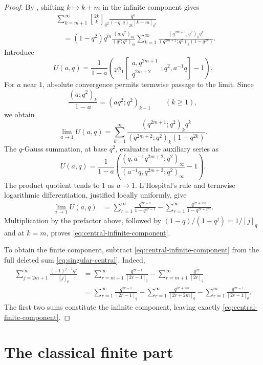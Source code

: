 \documentclass[11pt,oneside,openany]{book}
\theoremstyle{definition}
\theoremstyle{remark}
\newcommand{\Qbinom}[3]{\genfrac{[}{]}{0pt}{}{#1}{#2}_{#3}}
\begin{document}
\begin{proof}
By , shifting $k\mapsto k+m$ in the
infinite component gives
\begin{align*}
 &\sum_{k=m+1}^{\infty}
 \Qbinom{2k}{k}{q^2}
 \frac{q^k}{(-q;q)_{2k}[k-m]_{q^2}}\\
 &\quad=(1-q^2)q^m\frac{(q;q^2)_m}{(q^2;q^2)_m}
 \sum_{k=1}^{\infty}
 \frac{(q^{2m+1};q^2)_kq^k}
 {(q^{2m+2};q^2)_k(1-q^{2k})}.
\end{align*}
Introduce
\[
 U(a,q)=\frac{1}{1-a}\left(
 {}_2\phi_1\!\left[
 \begin{matrix}a,q^{2m+1}\\q^{2m+2}\end{matrix};q^2,a^{-1}q
 \right]-1\right).
\]
For $a$ near $1$, absolute convergence permits termwise passage to the
limit.  Since
\[
 \frac{(a;q^2)_k}{1-a}=(aq^2;q^2)_{k-1}\qquad(k\ge1),
\]
we obtain
\[
 \lim_{a\to1}U(a,q)=
 \sum_{k=1}^{\infty}
 \frac{(q^{2m+1};q^2)_kq^k}
 {(q^{2m+2};q^2)_k(1-q^{2k})}.
\]
The $q$-Gauss summation, at base $q^2$, evaluates the auxiliary series as
\[
 U(a,q)=\frac{1}{1-a}\left(
 \frac{(q,a^{-1}q^{2m+2};q^2)_\infty}
 {(a^{-1}q,q^{2m+2};q^2)_\infty}-1\right).
\]
The product quotient tends to $1$ as $a\to1$.  L'Hospital's rule and
termwise logarithmic differentiation, justified locally uniformly, give
\begin{align*}
 \lim_{a\to1}U(a,q)
 &=\sum_{r=1}^{\infty}\frac{q^{2r-1}}{1-q^{2r-1}}
   -\sum_{r=1}^{\infty}\frac{q^{2r+2m}}{1-q^{2r+2m}}.
\end{align*}
Multiplication by the prefactor above, followed by
$(1-q)/(1-q^j)=1/[j]_q$ and  at $k=m$,
proves \eqref{eq:central-infinite-component}.

To obtain the finite component, subtract
\eqref{eq:central-infinite-component} from the full deleted sum
\eqref{eq:singular-central}.  Indeed,
\begin{align*}
 \sum_{j=2m+1}^{\infty}\frac{(-1)^{j-1}q^j}{[j]_q}
 &=\sum_{r=m+1}^{\infty}\frac{q^{2r-1}}{[2r-1]_q}
   -\sum_{r=m+1}^{\infty}\frac{q^{2r}}{[2r]_q}\\
 &=\sum_{r=1}^{\infty}\frac{q^{2r-1}}{[2r-1]_q}
   -\sum_{r=1}^{\infty}\frac{q^{2r+2m}}{[2r+2m]_q}
   -\sum_{r=1}^{m}\frac{q^{2r-1}}{[2r-1]_q}.
\end{align*}
The first two sums constitute the infinite component, leaving exactly
\eqref{eq:central-finite-component}.
\end{proof}

\section{The classical finite part}
\end{document}
